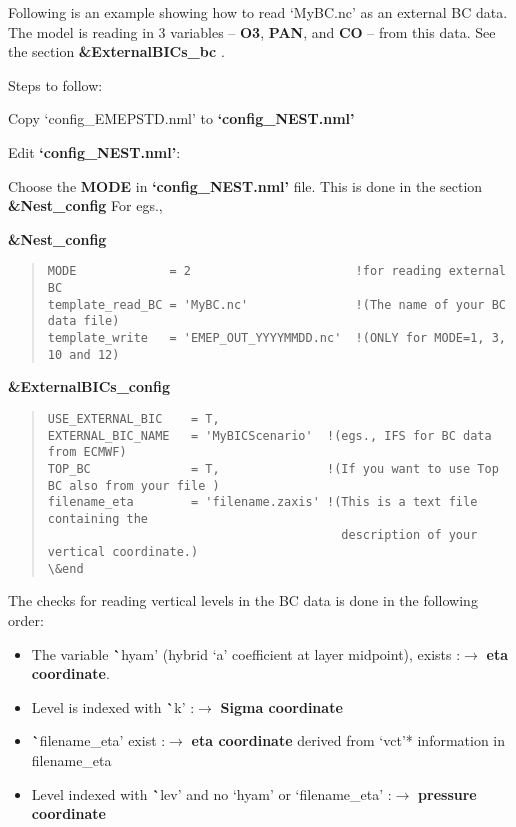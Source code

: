 Following is an example showing how to read `MyBC.nc' as an external BC data.  
The model is reading in 3 variables – {\bf O3}, {\bf PAN}, and {\bf CO} – from this data.  See the 	section {\bf \&ExternalBICs\_bc} . 

Steps to follow: 

	Copy `config\_EMEPSTD.nml' to {\bf `config\_NEST.nml'} 

	Edit {\bf `config\_NEST.nml'}:	

	Choose the {\bf MODE} in {\bf `config\_NEST.nml'} file. This is done in the section {\bf \&Nest\_config}
For egs.,

{\bf \&Nest\_config}
\begin{quote}
\begin{verbatim}
MODE		     = 2			           !for reading external BC 
template_read_BC = 'MyBC.nc'   		       !(The name of your BC data file)
template_write   = 'EMEP_OUT_YYYYMMDD.nc'  !(ONLY for MODE=1, 3, 10 and 12)
\end{verbatim}
\end{quote}


{\bf \&ExternalBICs\_config}
\begin{quote}
\begin{verbatim}
USE_EXTERNAL_BIC 	= T,
EXTERNAL_BIC_NAME 	= 'MyBICScenario'  !(egs., IFS for BC data from ECMWF) 
TOP_BC 		    	= T,   		       !(If you want to use Top BC also from your file )
filename_eta		= 'filename.zaxis' !(This is a text file containing the 
                                         description of your vertical coordinate.)			
\&end
\end{verbatim}
\end{quote}


The checks for reading vertical levels in the BC data is done in the following order:
\begin{itemize}
\item The variable {\textbf `hyam'} (hybrid `a' coefficient at layer midpoint), exists :${\rightarrow}$ {\bf eta coordinate}. 
\item Level is indexed with {\textbf `k'}  :${\rightarrow}$ {\bf Sigma coordinate}
\item {\textbf `filename\_eta'} exist :${\rightarrow}$ {\bf eta coordinate} derived from `vct'*  information in filename\_eta
\item Level indexed with {\textbf`lev'} and no `hyam' or `filename\_eta' :${\rightarrow}$ {\bf pressure coordinate}	
\end{itemize}


